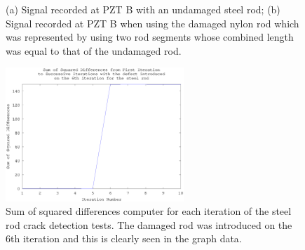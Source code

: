 \begin{figure}
\begin{subfigmatrix}{2}
\end{subfigmatrix}

  \caption[all]
  { \label{fig:steelCrackResults}
(a) Signal recorded at PZT B with an undamaged steel rod;
(b) Signal recorded at PZT B when using the damaged nylon rod which was represented by using two rod segments whose combined length was equal to that of the undamaged rod.
}
\end{figure}

\begin{figure}[ht!]
\centering
\includegraphics[width=0.6\textwidth]{eps_pics/steelDifferences}
\caption{Sum of squared differences computer for each iteration of the steel rod crack detection tests. The damaged rod was introduced on the 6th iteration and this is clearly seen in the graph data.
 	 \label{fig:steelDifferences}} 
\end{figure}


